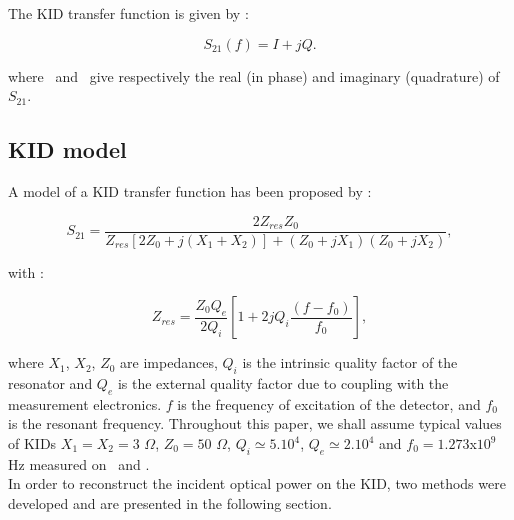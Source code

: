 The KID transfer function is given by :

\begin{equation}
S_{21}(f) = I +jQ .
\end{equation}

where \I\  and \Q\  give respectively the real (in phase) and imaginary (quadrature) of $S_{21}$.

\subsection{KID model}
A model of a KID transfer function has been proposed by \citet{2008ApPhL..93m4102G} :

\begin{equation}
S_{21} = \frac{2Z_{res}Z_{0}}{Z_{res}[2Z_{0} + j(X_{1}+X_{2})] + (Z_{0} +jX_{1})(Z_{0} +jX_{2})},
\end{equation}

with :

\begin{equation}
Z_{res} = \frac{Z_{0}Q_{e}}{2Q_{i}}[1 + 2jQ_{i}\frac{(f-f_{0})}{f_{0}}],
\end{equation}

where $X_{1}$, $X_{2}$, $Z_{0}$ are impedances, $Q_{i}$ is the intrinsic quality factor of the resonator and $Q_{e}$ is the external quality factor due to coupling with the measurement electronics. $f$ is the frequency of excitation of the detector, and $f_{0}$ is the resonant frequency. Throughout this paper, we shall assume typical values of KIDs $X_{1} = X_{2} = 3 $ $\Omega $, $Z_{0} = 50$ $\Omega$, $Q_{i} \simeq 5.10^{4}$, $Q_{e} \simeq 2.10^{4}$ and $f_{0} = 1.273$x$10^{9}$ Hz measured on \nika\ and \nikad. \\

In order to reconstruct the incident optical power on the KID, two methods were developed and are presented in the following section.
